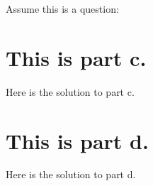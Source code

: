  Assume this is a question:
\begin{parts}
    \setcounter{partno}{2}
    \part{This is part c.}
    \begin{solution}
        Here is the solution to part c.
    \end{solution}

    \part{This is part d.}
    \begin{solution}
        Here is the solution to part d.
    \end{solution}
\end{parts}